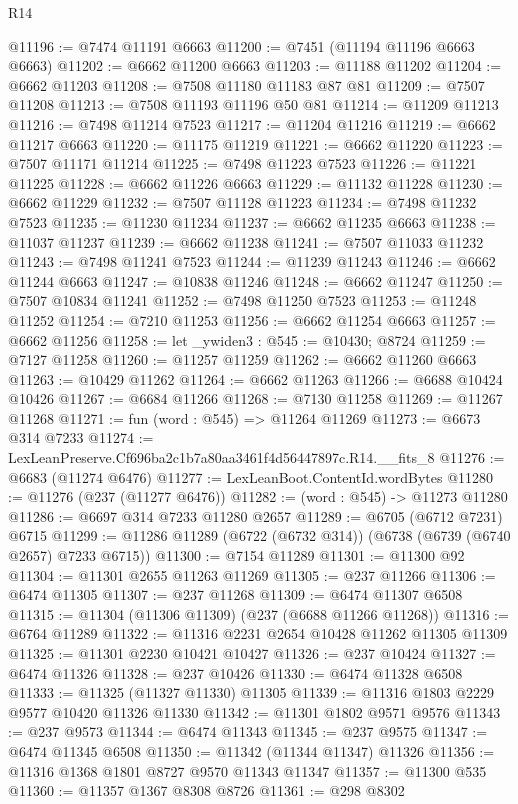 \begin{lexlean}{R14}
\begin{coremodule}
@11196 := @7474 @11191 @6663
@11200 := @7451 (@11194 @11196 @6663 @6663)
@11202 := @6662 @11200 @6663
@11203 := @11188 @11202
@11204 := @6662 @11203
@11208 := @7508 @11180 @11183 @87 @81
@11209 := @7507 @11208
@11213 := @7508 @11193 @11196 @50 @81
@11214 := @11209 @11213
@11216 := @7498 @11214 @7523
@11217 := @11204 @11216
@11219 := @6662 @11217 @6663
@11220 := @11175 @11219
@11221 := @6662 @11220
@11223 := @7507 @11171 @11214
@11225 := @7498 @11223 @7523
@11226 := @11221 @11225
@11228 := @6662 @11226 @6663
@11229 := @11132 @11228
@11230 := @6662 @11229
@11232 := @7507 @11128 @11223
@11234 := @7498 @11232 @7523
@11235 := @11230 @11234
@11237 := @6662 @11235 @6663
@11238 := @11037 @11237
@11239 := @6662 @11238
@11241 := @7507 @11033 @11232
@11243 := @7498 @11241 @7523
@11244 := @11239 @11243
@11246 := @6662 @11244 @6663
@11247 := @10838 @11246
@11248 := @6662 @11247
@11250 := @7507 @10834 @11241
@11252 := @7498 @11250 @7523
@11253 := @11248 @11252
@11254 := @7210 @11253
@11256 := @6662 @11254 @6663
@11257 := @6662 @11256
@11258 := let _ywiden3 : @545 := @10430; @8724
@11259 := @7127 @11258
@11260 := @11257 @11259
@11262 := @6662 @11260 @6663
@11263 := @10429 @11262
@11264 := @6662 @11263
@11266 := @6688 @10424 @10426
@11267 := @6684 @11266
@11268 := @7130 @11258
@11269 := @11267 @11268
@11271 := fun (word : @545) => @11264 @11269
@11273 := @6673 @314 @7233
@11274 := LexLeanPreserve.Cf696ba2c1b7a80aa3461f4d56447897c.R14.__fits_8
@11276 := @6683 (@11274 @6476)
@11277 := LexLeanBoot.ContentId.wordBytes
@11280 := @11276 (@237 (@11277 @6476))
@11282 := (word : @545) -> @11273 @11280
@11286 := @6697 @314 @7233 @11280 @2657
@11289 := @6705 (@6712 @7231) @6715
@11299 := @11286 @11289 (@6722 (@6732 @314)) (@6738 (@6739 (@6740 @2657) @7233 @6715))
@11300 := @7154 @11289
@11301 := @11300 @92
@11304 := @11301 @2655 @11263 @11269
@11305 := @237 @11266
@11306 := @6474 @11305
@11307 := @237 @11268
@11309 := @6474 @11307 @6508
@11315 := @11304 (@11306 @11309) (@237 (@6688 @11266 @11268))
@11316 := @6764 @11289
@11322 := @11316 @2231 @2654 @10428 @11262 @11305 @11309
@11325 := @11301 @2230 @10421 @10427
@11326 := @237 @10424
@11327 := @6474 @11326
@11328 := @237 @10426
@11330 := @6474 @11328 @6508
@11333 := @11325 (@11327 @11330) @11305
@11339 := @11316 @1803 @2229 @9577 @10420 @11326 @11330
@11342 := @11301 @1802 @9571 @9576
@11343 := @237 @9573
@11344 := @6474 @11343
@11345 := @237 @9575
@11347 := @6474 @11345 @6508
@11350 := @11342 (@11344 @11347) @11326
@11356 := @11316 @1368 @1801 @8727 @9570 @11343 @11347
@11357 := @11300 @535
@11360 := @11357 @1367 @8308 @8726
@11361 := @298 @8302

\end{coremodule}
\end{lexlean}
